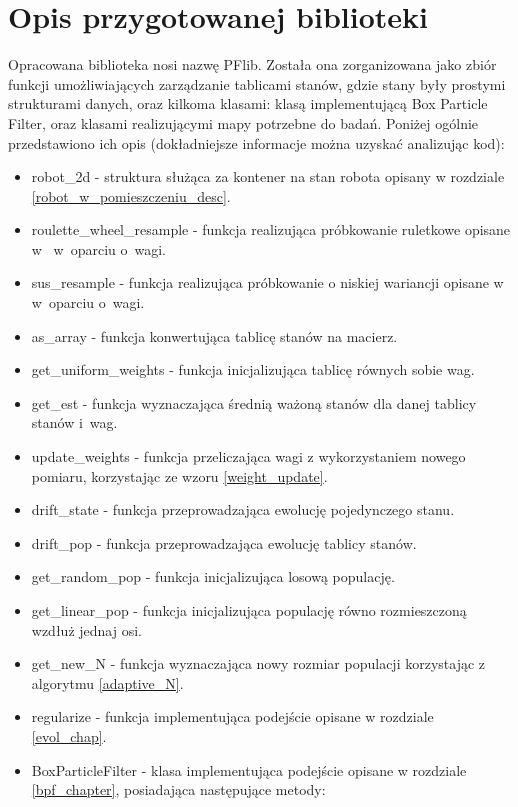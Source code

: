 \section{Opis przygotowanej biblioteki}
Opracowana biblioteka nosi nazwę PFlib. Została ona zorganizowana jako zbiór funkcji umożliwiających zarządzanie tablicami stanów, gdzie stany były prostymi strukturami danych, oraz kilkoma klasami: klasą implementującą Box Particle Filter, oraz klasami realizującymi mapy potrzebne do badań. Poniżej ogólnie przedstawiono ich opis (dokładniejsze informacje można uzyskać analizując kod):
\begin{itemize}
	\item robot\_2d - struktura służąca za kontener na stan robota opisany w rozdziale \ref{robot_w_pomieszczeniu_desc}.
	\item roulette\_wheel\_resample - funkcja realizująca próbkowanie ruletkowe opisane w~\cite{rou_wiki} w~oparciu o~wagi.
	\item sus\_resample - funkcja realizująca próbkowanie o niskiej wariancji opisane w~\cite{sus_wiki} w~oparciu o~wagi.
	\item as\_array - funkcja konwertująca tablicę stanów na macierz.
	\item get\_uniform\_weights - funkcja inicjalizująca tablicę równych sobie wag.
	\item get\_est - funkcja wyznaczająca średnią ważoną stanów dla danej tablicy stanów i~wag.
	\item update\_weights - funkcja przeliczająca wagi z wykorzystaniem nowego pomiaru, korzystając ze wzoru \ref{weight_update}.
	\item drift\_state - funkcja przeprowadzająca ewolucję pojedynczego stanu.
	\item drift\_pop - funkcja przeprowadzająca ewolucję tablicy stanów.
	\item get\_random\_pop - funkcja inicjalizująca losową populację.
	\item get\_linear\_pop - funkcja inicjalizująca populację równo rozmieszczoną wzdłuż jednaj osi.
	\item get\_new\_N - funkcja wyznaczająca nowy rozmiar populacji korzystając z algorytmu \ref{adaptive_N}.
	\item regularize - funkcja implementująca podejście opisane w rozdziale \ref{evol_chap}.
	\item BoxParticleFilter - klasa implementująca podejście opisane w rozdziale \ref{bpf_chapter}, posiadająca następujące metody:
	\begin{itemize}

\end{itemize}
\end{itemize}
